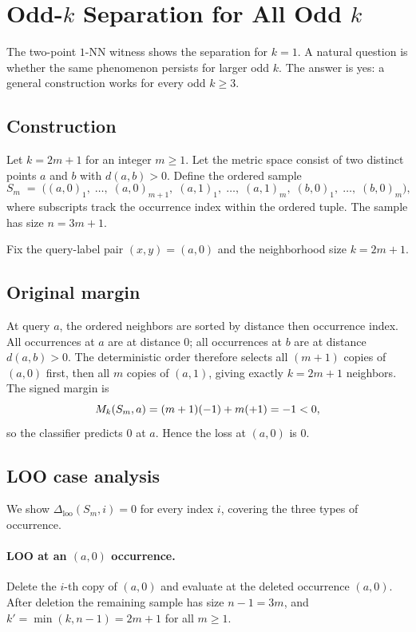 \section{Odd-$k$ Separation for All Odd $k$}
\label{sec:odd-k-separation}

The two-point $1$-NN witness shows the separation for $k=1$.  A natural
question is whether the same phenomenon persists for larger odd $k$.  The
answer is yes: a general construction works for every odd $k \ge 3$.

\subsection{Construction}

Let $k = 2m+1$ for an integer $m \ge 1$.  Let the metric space consist of two
distinct points $a$ and $b$ with $d(a,b) > 0$.  Define the ordered sample
\[
S_m \;=\; \big((a,0)_1,\; \ldots,\; (a,0)_{m+1},\;
          (a,1)_1,\; \ldots,\; (a,1)_{m},\;
          (b,0)_1,\; \ldots,\; (b,0)_{m}\big),
\]
where subscripts track the occurrence index within the ordered tuple.  The
sample has size $n = 3m+1$.

Fix the query-label pair $(x,y) = (a,0)$ and the neighborhood size $k = 2m+1$.

\subsection{Original margin}

At query $a$, the ordered neighbors are sorted by distance then occurrence
index.  All occurrences at $a$ are at distance $0$; all occurrences at $b$ are
at distance $d(a,b) > 0$.  The deterministic order therefore selects all
$(m+1)$ copies of $(a,0)$ first, then all $m$ copies of $(a,1)$, giving exactly
$k = 2m+1$ neighbors.  The signed margin is
\[
M_k(S_m, a) = (m+1)(-1) + m(+1) = -1 < 0,
\]
so the classifier predicts $0$ at $a$.  Hence the loss at $(a,0)$ is $0$.

\subsection{LOO case analysis}

We show $\Delta_{\mathrm{loo}}(S_m, i) = 0$ for every index $i$, covering the
three types of occurrence.

\paragraph{LOO at an $(a,0)$ occurrence.}
Delete the $i$-th copy of $(a,0)$ and evaluate at the deleted occurrence
$(a,0)$.  After deletion the remaining sample has size $n-1 = 3m$, and
$k' = \min(k, n-1) = 2m+1$ for all $m \ge 1$.

